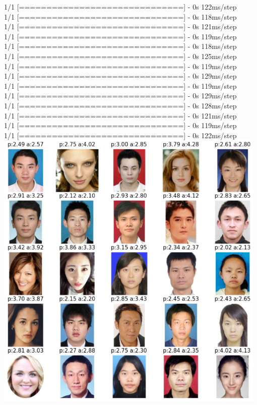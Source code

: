 \documentclass{article}
\begin{document}
1/1 [==============================] - 0s 122ms/step\\
1/1 [==============================] - 0s 118ms/step\\
1/1 [==============================] - 0s 121ms/step\\
1/1 [==============================] - 0s 119ms/step\\
1/1 [==============================] - 0s 118ms/step\\
1/1 [==============================] - 0s 125ms/step\\
1/1 [==============================] - 0s 119ms/step\\
1/1 [==============================] - 0s 129ms/step\\
1/1 [==============================] - 0s 119ms/step\\
1/1 [==============================] - 0s 129ms/step\\
1/1 [==============================] - 0s 128ms/step\\
1/1 [==============================] - 0s 121ms/step\\
1/1 [==============================] - 0s 119ms/step\\
1/1 [==============================] - 0s 122ms/step\\

\includegraphics[width=0.98\textwidth]{8.png}
\end{document}
